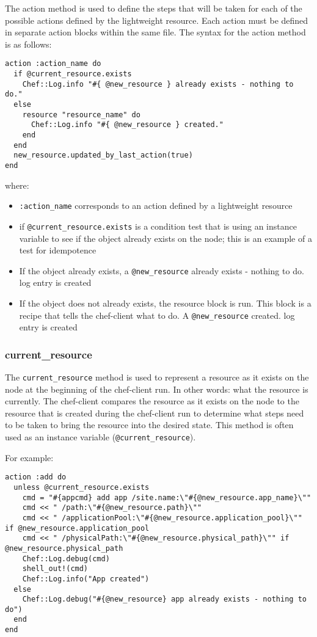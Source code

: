 The action method is used to define the steps that will be taken for each of the possible actions defined by the lightweight resource. Each action must be defined in separate action blocks within the same file. The syntax for the action method is as follows:

\begin{lstlisting}[label=lst:cookbook-lwrp-dsl-action]
action :action_name do
  if @current_resource.exists
    Chef::Log.info "#{ @new_resource } already exists - nothing to do."
  else
    resource "resource_name" do
      Chef::Log.info "#{ @new_resource } created."
    end
  end
  new_resource.updated_by_last_action(true)
end
\end{lstlisting}

where:

\begin{itemize}
  \item \lstinline!:action_name! corresponds to an action defined by a lightweight resource
  \item if \lstinline!@current_resource.exists! is a condition test that is using an instance variable to see if the object already exists on the node; this is an example of a test for idempotence
  \item If the object already exists, a \lstinline!@new_resource! already exists - nothing to do. log entry is created
  \item If the object does not already exists, the resource block is run. This block is a recipe that tells the chef-client what to do. A \lstinline!@new_resource! created. log entry is created
\end{itemize}

\subsubsection{current\_resource}

The \lstinline!current_resource! method is used to represent a resource as it exists on the node at the beginning of the chef-client run. In other words: what the resource is currently. The chef-client compares the resource as it exists on the node to the resource that is created during the chef-client run to determine what steps need to be taken to bring the resource into the desired state. This method is often used as an instance variable (\lstinline!@current_resource!).

For example:

\begin{lstlisting}[label=lst:cookbook-lwrp-dsl-current-resource]
action :add do
  unless @current_resource.exists
    cmd = "#{appcmd} add app /site.name:\"#{@new_resource.app_name}\""
    cmd << " /path:\"#{@new_resource.path}\""
    cmd << " /applicationPool:\"#{@new_resource.application_pool}\"" if @new_resource.application_pool
    cmd << " /physicalPath:\"#{@new_resource.physical_path}\"" if @new_resource.physical_path
    Chef::Log.debug(cmd)
    shell_out!(cmd)
    Chef::Log.info("App created")
  else
    Chef::Log.debug("#{@new_resource} app already exists - nothing to do")
  end
end
\end{lstlisting}

